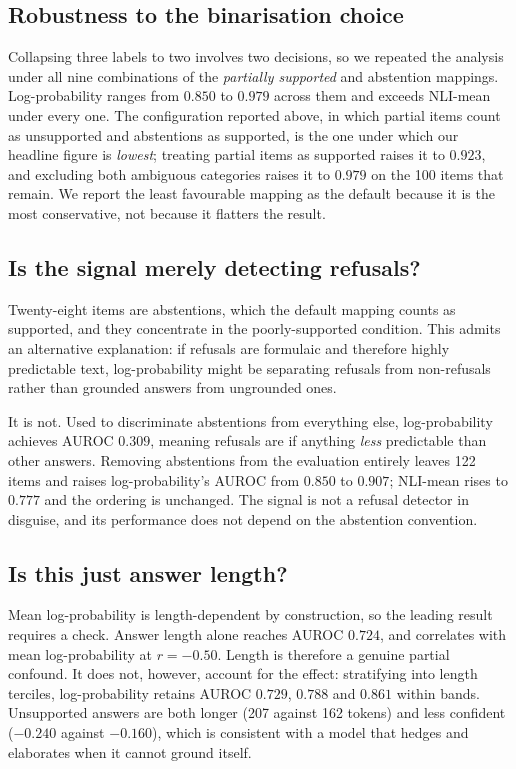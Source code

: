 \documentclass[11pt,a4paper]{article}
\begin{document}
\subsection{Robustness to the binarisation choice}

Collapsing three labels to two involves two decisions, so we repeated the
analysis under all nine combinations of the \emph{partially supported} and
abstention mappings. Log-probability ranges from $0.850$ to $0.979$ across them
and exceeds NLI-mean under every one. The configuration reported above, in which
partial items count as unsupported and abstentions as supported, is the one
under which our headline figure is \emph{lowest}; treating partial items as
supported raises it to $0.923$, and excluding both ambiguous categories raises
it to $0.979$ on the 100 items that remain. We report the least favourable
mapping as the default because it is the most conservative, not because it
flatters the result.

\subsection{Is the signal merely detecting refusals?}

Twenty-eight items are abstentions, which the default mapping counts as
supported, and they concentrate in the poorly-supported condition. This admits
an alternative explanation: if refusals are formulaic and therefore highly
predictable text, log-probability might be separating refusals from
non-refusals rather than grounded answers from ungrounded ones.

It is not. Used to discriminate abstentions from everything else,
log-probability achieves AUROC $0.309$, meaning refusals are if anything
\emph{less} predictable than other answers. Removing abstentions from the
evaluation entirely leaves 122 items and raises log-probability's AUROC from
$0.850$ to $0.907$; NLI-mean rises to $0.777$ and the ordering is unchanged. The
signal is not a refusal detector in disguise, and its performance does not
depend on the abstention convention.

\subsection{Is this just answer length?}

Mean log-probability is length-dependent by construction, so the leading result
requires a check. Answer length alone reaches AUROC $0.724$, and correlates with
mean log-probability at $r = -0.50$. Length is therefore a genuine partial
confound. It does not, however, account for the effect: stratifying into length
terciles, log-probability retains AUROC $0.729$, $0.788$ and $0.861$ within
bands. Unsupported answers are both longer (207 against 162 tokens) and less
confident ($-0.240$ against $-0.160$), which is consistent with a model that
hedges and elaborates when it cannot ground itself.
\end{document}
